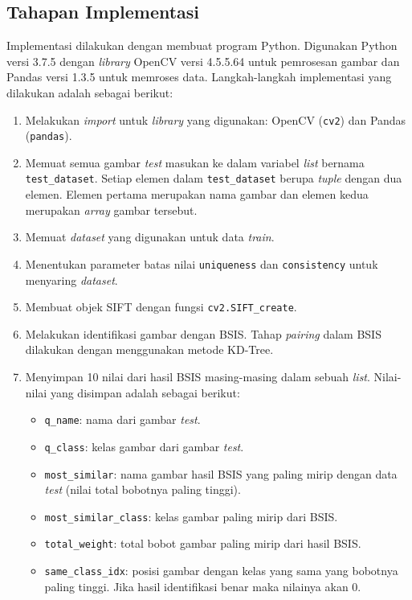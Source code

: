 \subsection{Tahapan Implementasi}
\label{subsec:analisis_oir_tahapan_implementasi}
Implementasi dilakukan dengan membuat program Python. Digunakan Python versi 3.7.5 dengan \textit{library} OpenCV versi 4.5.5.64 untuk pemrosesan gambar dan Pandas versi 1.3.5 untuk memroses data. Langkah-langkah implementasi yang dilakukan adalah sebagai berikut:
\begin{enumerate}
	\item Melakukan \textit{import} untuk \textit{library} yang digunakan: OpenCV (\texttt{cv2}) dan Pandas (\texttt{pandas}).
	\item Memuat semua gambar \textit{test} masukan ke dalam variabel \textit{list} bernama \texttt{test\_dataset}. Setiap elemen dalam \texttt{test\_dataset} berupa \textit{tuple} dengan dua elemen. Elemen pertama merupakan nama gambar dan elemen kedua merupakan \textit{array} gambar tersebut.
	\item Memuat \textit{dataset} yang digunakan untuk data \textit{train}.
	\item Menentukan parameter batas nilai \texttt{uniqueness} dan \texttt{consistency} untuk menyaring \textit{dataset}. 
	\item Membuat objek SIFT dengan fungsi \texttt{cv2.SIFT\_create}.
	\item Melakukan identifikasi gambar dengan BSIS. Tahap \textit{pairing} dalam BSIS dilakukan dengan menggunakan metode KD-Tree.
	\newpage
	\item Menyimpan 10 nilai dari hasil BSIS masing-masing dalam sebuah \textit{list}. Nilai-nilai yang disimpan adalah sebagai berikut:
	\begin{itemize}
		\item \texttt{q\_name}: nama dari gambar \textit{test}.
		\item \texttt{q\_class}: kelas gambar dari gambar \textit{test}.
		\item \texttt{most\_similar}: nama gambar hasil BSIS yang paling mirip dengan data \textit{test} (nilai total bobotnya paling tinggi).
		\item \texttt{most\_similar\_class}: kelas gambar paling mirip dari BSIS.
		\item \texttt{total\_weight}: total bobot gambar paling mirip dari hasil BSIS.
		\item \texttt{same\_class\_idx}: posisi gambar dengan kelas yang sama yang bobotnya paling tinggi. Jika hasil identifikasi benar maka nilainya akan 0.

\end{itemize}
\end{enumerate}
